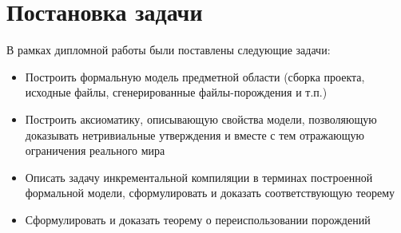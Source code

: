 \section{Постановка задачи}

В рамках дипломной работы были поставлены следующие задачи:

\begin{itemize}

	\item Построить формальную модель предметной области (сборка проекта, исходные файлы, сгенерированные файлы-порождения и т.п.)

	\item Построить аксиоматику, описывающую свойства модели, позволяющую доказывать нетривиальные утверждения и вместе с тем отражающую ограничения реального мира

	\item Описать задачу инкрементальной компиляции в терминах построенной формальной модели, сформулировать и доказать соответствующую теорему

	\item Сформулировать и доказать теорему о переиспользовании порождений

\end{itemize}
